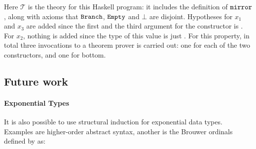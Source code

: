 Here $\mathcal{T}$ is the theory for this Haskell program: it includes
the definition of $\texttt{mirror}$, along with axioms that $\texttt{Branch}$,
$\texttt{Empty}$ and $\bot$ are disjoint.  Hypotheses for $x_1$ and $x_3$
are added since the first and the third argument for the 
constructor is . For $x_2$, nothing is added since the type
of this value is just .  For this property, in total three invocations
to a theorem prover is carried out: one for each of the two constructors, and one
for bottom.

\begin{comment}
    \note{I don't elaborate on this too much since the current
      implementation generates tree of a given depth instead of a given
      number of constructors. Specifying constructors could potentially
      give you less granularity: I need to investigate this}
    To generate theories for the approach in \ref{sec:genind} an algorithm
    was written to generate trees with a number of constructors. For the
    commutativity of plus example, you would start with the expression
    \hs{(x :: Nat,y :: Nat)}, and for each occurrence of a typed variable,
    you replace it with its constructors, and combine. Then an other
    algorithm takes a typed expression, like
    \hs{(Succ (x :: Nat),Succ (y :: Nat))} and returns all expressions
    with less constructors you can generate with the correct type with
    the typed variables, here \hs{(Nat,Nat)}. Then you proceed as in the
    simple case: one invocation to the theorem prover for each step,
    variables are skolemised and the predicate inlined.

    This leads to a combinatorial explosion for a lot of data types. If
    you need to prove something with length $n$ lists, you get a induction
    conclusion $P(x_1\hs{:}x_2\hs{:}\cdots\hs{:}x_n\hs{:}xs)}$, and as there
    are $n!$ combinations of $x_1 \cdots x_n$, making this approach
    unusable for high $n$. A better way would probably to just give you
    all sub trees instead of all possible trees: again, this of course
    depends on what you need to show.
\end{comment}

\subsection{Future work}
\label{sec:futind}

\paragraph{Exponential Types} It is also possible to use structural
induction for exponential data types. Examples are higher-order
abstract syntax, another is the Brouwer ordinals defined by
\citet{dixonphd} as:

